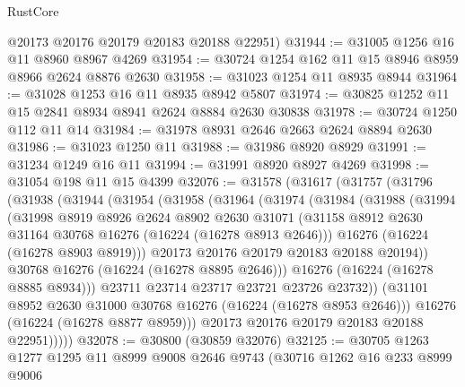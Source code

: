 \begin{lexlean}{RustCore}
\begin{coremodule}
      @20173
      @20176
      @20179
      @20183
      @20188
      @22951)
@31944 := @31005 @1256 @16 @11 @8960 @8967 @4269
@31954 := @30724 @1254 @162 @11 @15 @8946 @8959 @8966 @2624 @8876 @2630
@31958 := @31023 @1254 @11 @8935 @8944
@31964 := @31028 @1253 @16 @11 @8935 @8942 @5807
@31974 := @30825 @1252 @11 @15 @2841 @8934 @8941 @2624 @8884 @2630 @30838
@31978 := @30724 @1250 @112 @11 @14
@31984 := @31978 @8931 @2646 @2663 @2624 @8894 @2630
@31986 := @31023 @1250 @11
@31988 := @31986 @8920 @8929
@31991 := @31234 @1249 @16 @11
@31994 := @31991 @8920 @8927 @4269
@31998 := @31054 @198 @11 @15 @4399
@32076 := @31578
    (@31617
      (@31757
        (@31796
          (@31938
            (@31944
              (@31954
                (@31958
                  (@31964
                    (@31974
                      (@31984
                        (@31988
                          (@31994
                            (@31998
                              @8919
                              @8926
                              @2624
                              @8902
                              @2630
                              @31071
                              (@31158
                                @8912
                                @2630
                                @31164
                                @30768
                                @16276
                                (@16224 (@16278 @8913 @2646)))
                              @16276
                              (@16224 (@16278 @8903 @8919)))
                            @20173
                            @20176
                            @20179
                            @20183
                            @20188
                            @20194))
                        @30768
                        @16276
                        (@16224 (@16278 @8895 @2646)))
                      @16276
                      (@16224 (@16278 @8885 @8934)))
                    @23711
                    @23714
                    @23717
                    @23721
                    @23726
                    @23732))
                (@31101 @8952 @2630 @31000 @30768 @16276 (@16224 (@16278 @8953 @2646)))
                @16276
                (@16224 (@16278 @8877 @8959)))
              @20173
              @20176
              @20179
              @20183
              @20188
              @22951)))))
@32078 := @30800 (@30859 @32076)
@32125 := @30705
    @1263
    @1277
    @1295
    @11
    @8999
    @9008
    @2646
    @9743
    (@30716
      @1262
      @16
      @233
      @8999
      @9006

\end{coremodule}
\end{lexlean}

